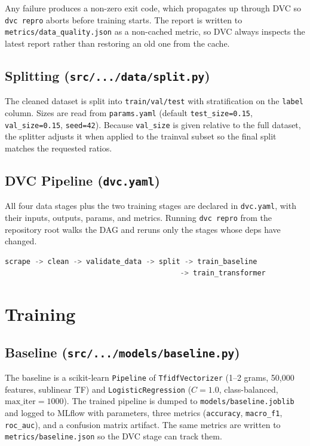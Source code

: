 \documentclass[11pt,a4paper]{article}
\begin{document}
Any failure produces a non-zero exit code, which propagates up through DVC so
\texttt{dvc repro} aborts before training starts. The report is written to
\texttt{metrics/data\_quality.json} as a non-cached metric, so DVC always inspects
the latest report rather than restoring an old one from the cache.

\subsection{Splitting (\texttt{src/.../data/split.py})}

The cleaned dataset is split into \texttt{train/val/test} with stratification on the
\texttt{label} column. Sizes are read from \texttt{params.yaml} (default
\texttt{test\_size=0.15}, \texttt{val\_size=0.15}, \texttt{seed=42}). Because
\texttt{val\_size} is given relative to the full dataset, the splitter adjusts it
when applied to the trainval subset so the final split matches the requested ratios.

\subsection{DVC Pipeline (\texttt{dvc.yaml})}

All four data stages plus the two training stages are declared in \texttt{dvc.yaml},
with their inputs, outputs, params, and metrics. Running \texttt{dvc repro} from the
repository root walks the DAG and reruns only the stages whose deps have changed.

\begin{lstlisting}[language=Python, caption={Pipeline DAG (simplified from \texttt{dvc.yaml})}]
scrape -> clean -> validate_data -> split -> train_baseline
                                         -> train_transformer
\end{lstlisting}

\section{Training}

\subsection{Baseline (\texttt{src/.../models/baseline.py})}

The baseline is a scikit-learn \texttt{Pipeline} of \texttt{TfidfVectorizer} (1--2
grams, 50{,}000 features, sublinear TF) and \texttt{LogisticRegression}
($C=1.0$, class-balanced, $\text{max\_iter}=1000$). The trained pipeline is dumped
to \texttt{models/baseline.joblib} and logged to MLflow with parameters, three
metrics (\texttt{accuracy}, \texttt{macro\_f1}, \texttt{roc\_auc}), and a confusion
matrix artifact. The same metrics are written to \texttt{metrics/baseline.json} so
the DVC stage can track them.
\end{document}
